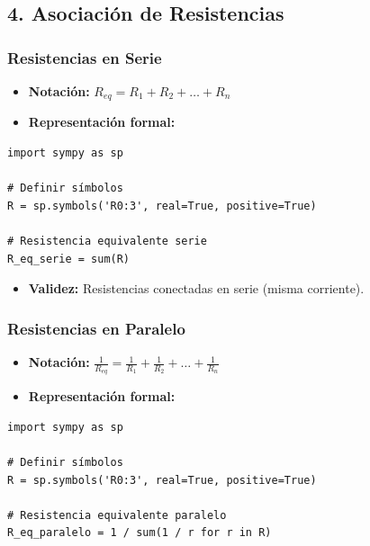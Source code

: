 \documentclass[11pt,a4paper]{article}
\begin{document}
\subsection*{4. Asociación de Resistencias}


\subsubsection*{Resistencias en Serie}


\begin{itemize}[leftmargin=*,topsep=2pt,itemsep=1pt]
  \item \textbf{Notación:} $R_{eq} = R_1 + R_2 + \dots + R_n$
  \item \textbf{Representación formal:}
\end{itemize}


\begin{lstlisting}
import sympy as sp

# Definir símbolos
R = sp.symbols('R0:3', real=True, positive=True)

# Resistencia equivalente serie
R_eq_serie = sum(R)
\end{lstlisting}


\begin{itemize}[leftmargin=*,topsep=2pt,itemsep=1pt]
  \item \textbf{Validez:} Resistencias conectadas en serie (misma corriente).
\end{itemize}


\subsubsection*{Resistencias en Paralelo}


\begin{itemize}[leftmargin=*,topsep=2pt,itemsep=1pt]
  \item \textbf{Notación:} $\frac{1}{R_{eq}} = \frac{1}{R_1} + \frac{1}{R_2} + \dots + \frac{1}{R_n}$
  \item \textbf{Representación formal:}
\end{itemize}


\begin{lstlisting}
import sympy as sp

# Definir símbolos
R = sp.symbols('R0:3', real=True, positive=True)

# Resistencia equivalente paralelo
R_eq_paralelo = 1 / sum(1 / r for r in R)
\end{lstlisting}
\end{document}
